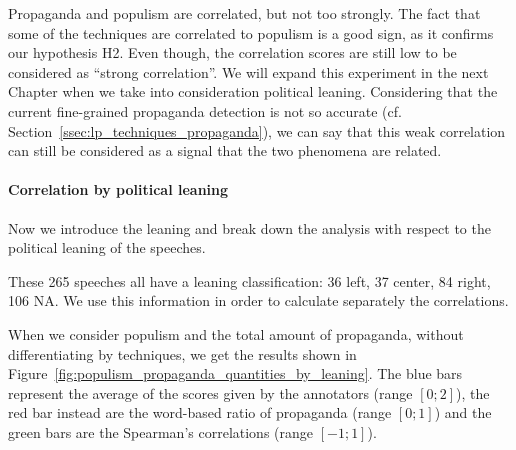 Propaganda and populism are correlated, but not too strongly.
The fact that some of the techniques are correlated to populism is a good sign, as it confirms our hypothesis H2. Even though, the correlation scores are still low to be considered as ``strong correlation''. We will expand this experiment in the next Chapter when we take into consideration political leaning.
Considering that the current fine-grained propaganda detection is not so accurate (cf. Section~\ref{ssec:lp_techniques_propaganda}), we can say that this weak correlation can still be considered as a signal that the two phenomena are related.


\paragraph{Correlation by political leaning}
Now we introduce the leaning and %
break down the analysis with respect to the political leaning of the speeches.

These 265 speeches all have a leaning classification: 36 left, 37 center, 84 right, 106 NA. We use this information in order to calculate separately the correlations.


When we consider populism and the total amount of propaganda, without differentiating by techniques, we get the results shown in Figure~\ref{fig:populism_propaganda_quantities_by_leaning}. The blue bars represent the average of the scores given by the annotators (range $[0;2]$), the red bar instead are the word-based ratio of propaganda (range $[0;1]$) and the green bars are the Spearman's correlations (range $[-1;1]$).


